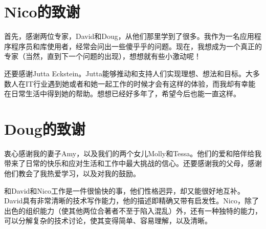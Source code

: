 \section*{Nico的致谢}

首先，感谢两位专家，David和Doug，从他们那里学到了很多。我作为一名应用程序程序员和库使用者，经常会问出一些傻乎乎的问题。现在，我想成为一个真正的专家（当然，直到下一个问题的出现），想想就有些小激动呢！

还要感谢Jutta Eckstein。Jutta能够推动和支持人们实现理想、想法和目标。大多数人在IT行业遇到她或者和她一起工作的时候才会有这样的体验，而我却有幸能在日常生活中得到她的帮助。想想已经好多年了，希望今后也能一直这样。

\section*{Doug的致谢}

衷心感谢我的妻子Amy，以及我们的两个女儿Molly和Tessa。他们的爱和陪伴给我带来了日常的快乐和应对生活和工作中最大挑战的信心。还要感谢我的父母，感谢他们教会了我热爱学习，以及对我的鼓励。

和David和Nico工作是一件很愉快的事，他们性格迥异，却又能很好地互补。David具有非常清晰的技术写作能力，他的描述即精确又带有启发性。Nico，除了出色的组织能力（使其他两位合著者不至于陷入混乱）外，还有一种独特的能力，可以分解复杂的技术讨论，使其变得简单、容易理解，以及清晰。


